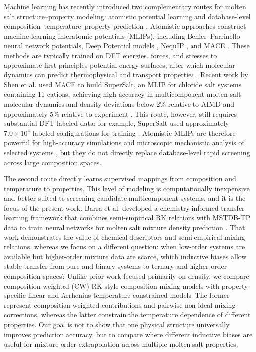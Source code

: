 \documentclass[journal=jctcce,manuscript=article,doi=true]{achemso}
\begin{document}
Machine learning has recently introduced two complementary routes for molten salt structure--property modeling: atomistic potential learning and database-level composition--temperature--property prediction \cite{porter2022computational,ravichandran2024eutectics}. Atomistic approaches construct machine-learning interatomic potentials (MLIPs), including Behler--Parrinello neural network potentials, Deep Potential models \cite{behler2007generalized,zhang2018deep}, NequIP \cite{batzner2022e3}, and MACE \cite{batatia2022mace}. These methods are typically trained on DFT energies, forces, and stresses to approximate first-principles potential-energy surfaces, after which molecular dynamics can predict thermophysical and transport properties \cite{lam2021modeling}. Recent work by Shen et al. used MACE to build SuperSalt, an MLIP for chloride salt systems containing 11 cations, achieving high accuracy in multicomponent molten salt molecular dynamics and density deviations below 2\% relative to AIMD and approximately 5\% relative to experiment \cite{shen2025supersalt}. This route, however, still requires substantial DFT-labeled data; for example, SuperSalt used approximately \(7.0 \times 10^4\) labeled configurations for training \cite{shen2025supersalt}. Atomistic MLIPs are therefore powerful for high-accuracy simulations and microscopic mechanistic analysis of selected systems \cite{gibson2025computing}, but they do not directly replace database-level rapid screening across large composition spaces.

The second route directly learns supervised mappings from composition and temperature to properties. This level of modeling is computationally inexpensive and better suited to screening candidate multicomponent systems, and it is the focus of the present work. Barra et al. developed a chemistry-informed transfer learning framework that combines semi-empirical RK relations with MSTDB-TP data to train neural networks for molten salt mixture density prediction \cite{barra2025generalizable}. That work demonstrates the value of chemical descriptors and semi-empirical mixing relations, whereas we focus on a different question: when low-order systems are available but higher-order mixture data are scarce, which inductive biases allow stable transfer from pure and binary systems to ternary and higher-order composition spaces? Unlike prior work focused primarily on density, we compare composition-weighted (CW) RK-style composition-mixing models with property-specific linear and Arrhenius temperature-constrained models. The former represent composition-weighted contributions and pairwise non-ideal mixing corrections, whereas the latter constrain the temperature dependence of different properties. Our goal is not to show that one physical structure universally improves prediction accuracy, but to compare where different inductive biases are useful for mixture-order extrapolation across multiple molten salt properties.
\end{document}

